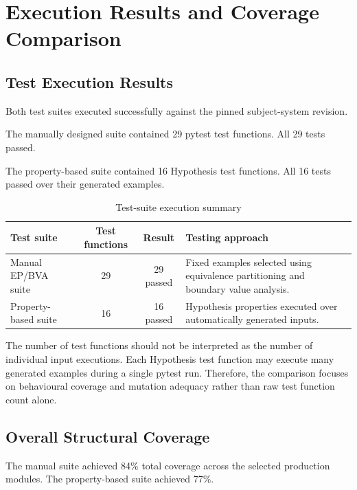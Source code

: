 \documentclass[12pt]{article}
\begin{document}
\section{Execution Results and Coverage Comparison}

\subsection{Test Execution Results}

Both test suites executed successfully against the pinned subject-system
revision.

The manually designed suite contained 29 pytest test functions. All 29 tests
passed.

The property-based suite contained 16 Hypothesis test functions. All 16 tests
passed over their generated examples.

\begin{table}[H]
\centering
\caption{Test-suite execution summary}
\label{tab:test-execution-summary}

\begin{tabular}{|p{5cm}|c|c|p{4.2cm}|}
\hline
\textbf{Test suite} &
\textbf{Test functions} &
\textbf{Result} &
\textbf{Testing approach} \\
\hline

Manual EP/BVA suite &
29 &
29 passed &
Fixed examples selected using equivalence partitioning and boundary value
analysis. \\
\hline

Property-based suite &
16 &
16 passed &
Hypothesis properties executed over automatically generated inputs. \\
\hline

\end{tabular}
\end{table}

The number of test functions should not be interpreted as the number of
individual input executions. Each Hypothesis test function may execute many
generated examples during a single pytest run. Therefore, the comparison
focuses on behavioural coverage and mutation adequacy rather than raw test
function count alone.

\subsection{Overall Structural Coverage}

The manual suite achieved 84\% total coverage across the selected production
modules. The property-based suite achieved 77\%.
\end{document}
